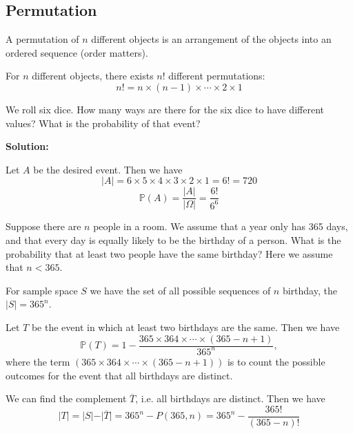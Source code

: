 \subsection{Permutation}

\begin{definition}[Permutation]
    A permutation of \(n\) different objects is an arrangement of the objects into an ordered sequence (order matters).
\end{definition}

\begin{proposition}
    For \(n\) different objects, there exists \(n!\) different permutations:
    \[
        n! = n \times (n-1) \times \cdots \times 2 \times 1
    \]
\end{proposition}

\begin{eg}
    We roll six dice. How many ways are there for the six dice to have different values? What is the probability of that event?
    
    \textbf{Solution:}
    
    Let \(A\) be the desired event. Then we have
    \[
        \vert A \vert = 6 \times 5 \times 4 \times 3 \times 2 \times 1 = 6! = 720
    \]
    \[
        \mathbb{P}(A) = \dfrac{\vert A \vert }{\vert \Omega \vert } = \dfrac{6!}{6^6}
    \]
\end{eg}

\begin{eg}
    Suppose there are \(n\) people in a room. We assume that a year only has 365 days, and that every day is equally likely to be the birthday of a person. What is the probability that at least two people have the same birthday? Here we assume that \(n < 365\). 

    For sample space \(S\) we have the set of all possible sequences of \(n\) birthday, the \(\vert S \vert = 365^n\). 

    Let \(T\) be the event in which at least two birthdays are the same. Then we have
    \[
        \mathbb{P}(T) = 1 - \dfrac{365 \times 364 \times \cdots \times (365 - n + 1)}{365^n},
    \]
    where the term \((365 \times 364 \times \cdots \times (365 - n + 1))\) is to count the possible outcomes for the event that all birthdays are distinct.
    
    We can find the complement \(\overline{T}\), i.e. all birthdays are distinct. Then we have
    \[
        \vert T \vert = \vert S \vert - \vert \overline{T} \vert = 365^n - P(365, n) = 365^n - \dfrac{365!}{(365 - n)!}
    \]
\end{eg}

